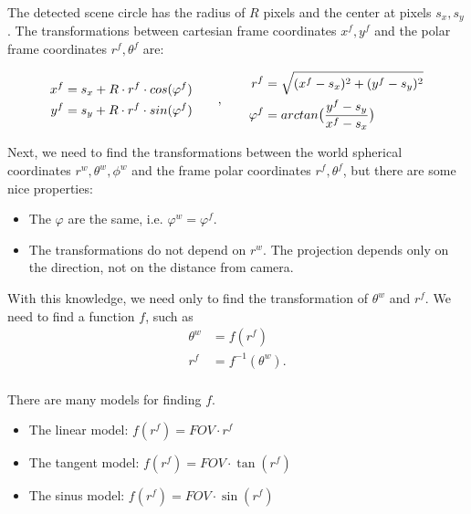 \documentclass[a4paper,12pt,titlepage, twoside]{article}
\numberwithin{figure}{section}
\begin{document}
The detected scene circle has the radius of $R$ pixels and the center at pixels $s_x, s_y$. The transformations between cartesian frame coordinates $x^f, y^f$ and the polar frame coordinates $r^f, \theta^f$ are:

\begin{equation*}
\begin{aligned}[c]
x^f &= s_x + R \cdot r^f \cdot cos(\varphi^f) \\
y^f &= s_y + R \cdot r^f \cdot sin(\varphi^f) \\
\end{aligned}
\qquad,\qquad
\begin{aligned}[c]
r^f &= \sqrt{(x^f - s_x)^2 + (y^f - s_y)^2} \\
\varphi^f &= arctan\big{(}\frac{y^f - s_y}{x^f - s_x}\big{)}
\end{aligned}
\end{equation*}

Next, we need to find the transformations between the world spherical coordinates $r^w, \theta^w, \phi^w$ and the frame polar coordinates $r^f, \theta^f$, but there are some nice properties:

\begin{itemize}
\item The $\varphi$ are the same, i.e. $\varphi^w = \varphi^f$.
\item The transformations do not depend on $r^w$. The projection depends only on the direction, not on the distance from camera.
\end{itemize}

With this knowledge, we need only to find the transformation of $\theta^w$ and $r^f$. We need to find a function $f$, such as 
\begin{equation}
\begin{aligned}
\theta^w &= f(r^f) \\
r^f &= f^{-1}(\theta^w). \\
\end{aligned}
\end{equation}

There are many models for finding $f$. 

\begin{itemize}
\item The linear model: $f(r^f) = FOV \cdot r^f$
\item The tangent model: $f(r^f) = FOV \cdot \tan(r^f)$
\item The sinus model: $f(r^f) = FOV \cdot \sin(r^f)$
\end{itemize}
\end{document}
